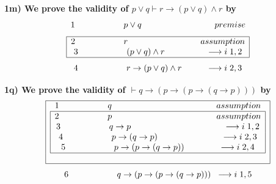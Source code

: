 \documentclass[a4paper]{article}
\begin{document}
\textbf{\large\hspace{1cm} 1m) We prove the validity of	$p \vee q \vdash r \rightarrow (p \vee q) \wedge r$ by}
{\large$$1 \hspace{2 cm} p \vee q \hspace{3 cm} premise$$
$$\begin{array}{|c|} 
\hline
\textcolor{black}{2 \hspace{2 cm} r \hspace{3 cm} assumption}\\
\textcolor{black}{3 \hspace{2 cm} (p \vee q) \wedge r \hspace{1.7 cm} \longrightarrow i \hspace{0.1 cm} 1,2}\\
\hline
\end{array}$$
$$4 \hspace{2 cm} r \rightarrow (p \vee q) \wedge r \hspace{1 cm} \longrightarrow i\hspace{0.1 cm} 2,3$$}

\textbf{{\large\hspace{1 cm} 1q) We prove the validity of $\vdash q \rightarrow (p \rightarrow (p \rightarrow (q \rightarrow p)))$ by}}
{\large $$\begin{array}{|c|}
\hline 
\textcolor{black}{1 \hspace{2 cm} q \hspace{4.3 cm} assumption}\\ 
\begin{array}{|c|}
\hline 
\textcolor{black}{2 \hspace{2 cm} p \hspace{4.3 cm} assumption} \\ 
\textcolor{black}{3 \hspace{2 cm} q \rightarrow p \hspace{3.8 cm} \longrightarrow i \hspace{0.1 cm}1,2} \\ 
\textcolor{black}{4 \hspace{2 cm} p \rightarrow (q \rightarrow p) \hspace{2.6 cm} \longrightarrow i \hspace{0.1 cm}2,3} \\ 
\textcolor{black}{5 \hspace{2 cm} p \rightarrow (p \rightarrow (q \rightarrow p)) \hspace{1.4 cm} \longrightarrow i \hspace{0.1 cm}2,4} \\ 
\hline 
\end{array} \\
\\
\hline
\end{array} \\$$ $$\textcolor{black}{6 \hspace{2 cm} q \rightarrow (p \rightarrow (p \rightarrow (q \rightarrow p))) \hspace{0.2 cm} \longrightarrow i \hspace{0.1 cm}1,5} \\ $$}
\end{document}
